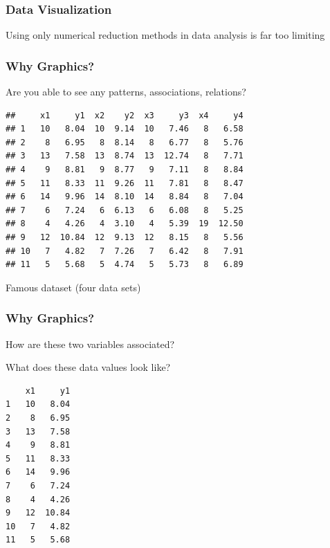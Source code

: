 \documentclass[12pt]{beamer}\usepackage[]{graphicx}\usepackage[]{color}
\makeatletter
\newenvironment{kframe}{%
 \def\at@end@of@kframe{}%
 \ifinner\ifhmode%
  \def\at@end@of@kframe{\end{minipage}}%
  \begin{minipage}{\columnwidth}%
 \fi\fi%
 \def\FrameCommand##1{\hskip\@totalleftmargin \hskip-\fboxsep
 \colorbox{shadecolor}{##1}\hskip-\fboxsep
     \hskip-\linewidth \hskip-\@totalleftmargin \hskip\columnwidth}%
 \MakeFramed {\advance\hsize-\width
   \@totalleftmargin\z@ \linewidth\hsize
   \@setminipage}}%
 {\par\unskip\endMakeFramed%
 \at@end@of@kframe}
\newenvironment{knitrout}{}{} %
\makeatother
\begin{document}
\begin{frame}
\frametitle{Data Visualization}

Using only numerical reduction methods in data analysis is far too limiting

\end{frame}


\begin{frame}[fragile]
\frametitle{Why Graphics?}

Are you able to see any patterns, associations, relations?
\begin{knitrout}\scriptsize
{}\color{fgcolor}\begin{kframe}
\begin{verbatim}
##     x1     y1  x2    y2  x3     y3  x4     y4
## 1   10   8.04  10  9.14  10   7.46   8   6.58
## 2    8   6.95   8  8.14   8   6.77   8   5.76
## 3   13   7.58  13  8.74  13  12.74   8   7.71
## 4    9   8.81   9  8.77   9   7.11   8   8.84
## 5   11   8.33  11  9.26  11   7.81   8   8.47
## 6   14   9.96  14  8.10  14   8.84   8   7.04
## 7    6   7.24   6  6.13   6   6.08   8   5.25
## 8    4   4.26   4  3.10   4   5.39  19  12.50
## 9   12  10.84  12  9.13  12   8.15   8   5.56
## 10   7   4.82   7  7.26   7   6.42   8   7.91
## 11   5   5.68   5  4.74   5   5.73   8   6.89
\end{verbatim}
\end{kframe}
\end{knitrout}

{\small Famous dataset  (four data sets)}
\end{frame}


\begin{frame}[fragile]
\frametitle{Why Graphics?}

How are these two variables associated?

\bigskip
What does these data values look like?
\begin{knitrout}\scriptsize
{}\color{fgcolor}\begin{kframe}
\begin{verbatim}
    x1     y1
1   10   8.04
2    8   6.95
3   13   7.58
4    9   8.81
5   11   8.33
6   14   9.96
7    6   7.24
8    4   4.26
9   12  10.84
10   7   4.82
11   5   5.68
\end{verbatim}
\end{kframe}
\end{knitrout}

\end{frame}
\end{document}
